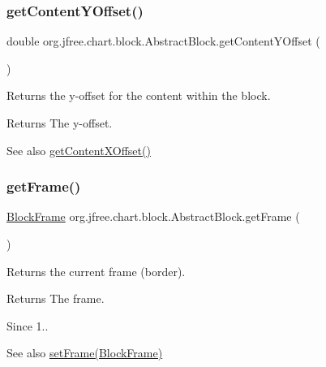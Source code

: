 \subsubsection{\texorpdfstring{get\+Content\+Y\+Offset()}{getContentYOffset()}}
{\footnotesize\ttfamily double org.\+jfree.\+chart.\+block.\+Abstract\+Block.\+get\+Content\+Y\+Offset (\begin{DoxyParamCaption}{ }\end{DoxyParamCaption})}

Returns the y-\/offset for the content within the block.

\begin{DoxyReturn}{Returns}
The y-\/offset.
\end{DoxyReturn}
\begin{DoxySeeAlso}{See also}
\mbox{\hyperlink{classorg_1_1jfree_1_1chart_1_1block_1_1_abstract_block_a7ef10497b6cb5b58586f0420732c10ec}{get\+Content\+X\+Offset()}} 
\end{DoxySeeAlso}
\mbox{\label{classorg_1_1jfree_1_1chart_1_1block_1_1_abstract_block_a7ac4f2b628be6227111e529d568f162e}} 
\subsubsection{\texorpdfstring{get\+Frame()}{getFrame()}}
{\footnotesize\ttfamily \mbox{\hyperlink{interfaceorg_1_1jfree_1_1chart_1_1block_1_1_block_frame}{Block\+Frame}} org.\+jfree.\+chart.\+block.\+Abstract\+Block.\+get\+Frame (\begin{DoxyParamCaption}{ }\end{DoxyParamCaption})}

Returns the current frame (border).

\begin{DoxyReturn}{Returns}
The frame.
\end{DoxyReturn}
\begin{DoxySince}{Since}
1.. 
\end{DoxySince}
\begin{DoxySeeAlso}{See also}
\mbox{\hyperlink{classorg_1_1jfree_1_1chart_1_1block_1_1_abstract_block_a44b7622fb43df6da2295e792302359d9}{set\+Frame(\+Block\+Frame)}} 
\end{DoxySeeAlso}
\mbox{\label{classorg_1_1jfree_1_1chart_1_1block_1_1_abstract_block_a29c5a029ad8b86eca5f234b61ab307be}} 
